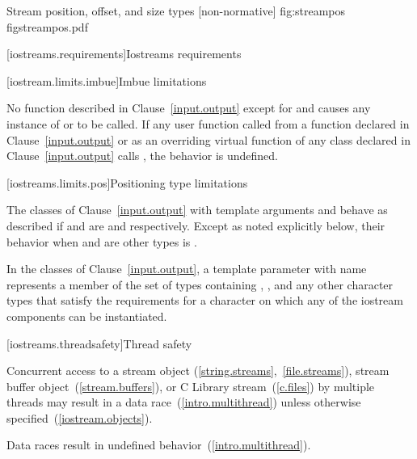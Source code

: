 \begin{importgraphic}
{Stream position, offset, and size types [non-normative]}
{fig:streampos}
{figstreampos.pdf}
\end{importgraphic}

[iostreams.requirements]{Iostreams requirements}

[iostream.limits.imbue]{Imbue limitations}

\pnum
No function described in Clause~\ref{input.output} except for
and 
causes any instance of
or
to be called.
If any user function called from a function declared in Clause~\ref{input.output} or
as an overriding virtual function of any class declared in Clause~\ref{input.output}
calls
,
the behavior is undefined.

[iostreams.limits.pos]{Positioning type limitations}

\pnum
The classes of Clause~\ref{input.output} with template arguments
and
behave as described if
and
are
and
respectively.
Except as noted explicitly below, their behavior when
and
are other types is
.

\pnum
In the classes of Clause~\ref{input.output}, a template parameter with name
 represents a member of the set of types containing , ,
and any other 
character types that satisfy the requirements for a character on which any of
the iostream components can be instantiated.

[iostreams.threadsafety]{Thread safety}

\pnum
Concurrent access to a stream object (\ref{string.streams},~\ref{file.streams}), stream buffer
object~(\ref{stream.buffers}), or C Library stream~(\ref{c.files}) by multiple threads may result in
a data race~(\ref{intro.multithread}) unless otherwise specified~(\ref{iostream.objects}).
\begin{note} Data races result in undefined behavior~(\ref{intro.multithread}). \end{note}

